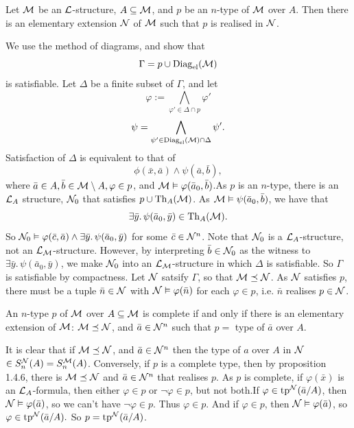 \documentclass{article}
\numberwithin{thm}{subsection}
\begin{document}
\begin{fancyprop}{}
    Let $\mathcal{M}$ be an $\mathcal{L}$-structure, $A \subseteq \mathcal{M}$, and $p$ be an $n$-type of $\mathcal{M}$ over $A$. Then there is an elementary extension $\mathcal{N}$ of $\mathcal{M}$ such that $p$ is realised in $\mathcal{N}$.
\end{fancyprop}
\proof We use the method of diagrams, and show that \[ \Gamma = p \cup \operatorname{Diag}_{\text{el}}(\mathcal{M})\] is satisfiable. \gap
Let $\Delta$ be a finite subset of $\Gamma$, and let \[ \varphi := \bigwedge_{\varphi' \in \Delta \cap p} \varphi'\] \[ \psi = \bigwedge_{\psi' \in \operatorname{Diag}_{\text{el}}(\mathcal{M}) \cap \Delta } \psi'. \]
Satisfaction of $\Delta$ is equivalent to that of \[ \phi(\bar x, \bar a) \wedge \psi(\bar a, \bar b),\]
where $\bar a \in A, \bar b \in \mathcal{M} \setminus A, \varphi \in p$, and $\mathcal{M} \vDash \varphi(\bar a_{0}, \bar b)$.\gap As $p$ is an $n$-type, there is an $\mathcal{L}_{A}$ structure, $\mathcal{N}_{0}$ that satisfies $p \cup \operatorname{Th}_{A}(\mathcal{M})$. As $\mathcal{M} \vDash \psi(\bar a_{0}, \bar b)$, we have that \[ \exists \bar y. \, \psi(\bar a_{0}, \bar y) \in \operatorname{Th}_{A}(\mathcal{M}).\] So $\mathcal{N}_{0} \vDash \varphi(\bar c, \bar a) \wedge \exists \bar y. \, \psi( \bar a_{0}, \bar y)$ for some $\bar c \in \mathcal{N}^{n}$. Note that $\mathcal{N}_{0}$ is a $\mathcal{L}_{A}$-structure, not an $\mathcal{L}_{\mathcal{M}}$-structure. However, by interpreting $\bar b \in \mathcal{N}_{0}$ as the witness to $\exists \bar y. \, \psi(\bar a_{0}, \bar y)$, we make $\mathcal{N}_{0}$ into an $\mathcal{L}_{\mathcal{M}}$-structure in which $\Delta$ is satisfiable. So $\Gamma$ is satisfiable by compactness. \gap Let $\mathcal{N}$ satsify $\Gamma$, so that $\mathcal{M} \preceq \mathcal{N}$. As $\mathcal{N}$ satisfies $p$, there must be a tuple $\bar n \in \mathcal{N}$ with $\mathcal{N} \vDash \varphi(\bar n)$ for each $\varphi \in p$, i.e. $\bar n$ realises $p \in \mathcal{N}$. \endproof
\begin{corr}{}
    An $n$-type $p$ of $\mathcal{M}$ over $A \subseteq \mathcal{M}$ is complete if and only if there is an elementary extension of $\mathcal{M}$: $\mathcal{M} \preceq \mathcal{N}$, and $\bar a \in \mathcal{N}^{n}$ such that $p = $ type of $\bar a$ over $A$.
\end{corr}
\proof It is clear that if $\mathcal{M} \preceq \mathcal{N}$, and $\bar a \in \mathcal{N}^{n}$ then the type of $a$ over $A$ in $\mathcal{N}$ $\in S_{n}^{\mathcal{N}}(A)=S_{n}^{\mathcal{M}}(A)$. \gap Conversely, if $p$ is a complete type, then by proposition 1.4.6, there is $\mathcal{M} \preceq \mathcal{N}$ and $\bar a \in \mathcal{N}^{n}$ that realises $p$. As $p$ is complete, if $\varphi(\bar x)$ is an $\mathcal{L}_{A}$-formula, then either $\varphi \in p$ or $\neg \varphi \in p$, but not both.\gap If $\varphi \in \operatorname{tp}^{\mathcal{N}}(\bar a /A)$, then $\mathcal{N} \vDash \varphi(\bar a)$, so we can't have $\neg \varphi \in p$. Thus $\varphi \in p$. And if $\varphi \in p$, then $\mathcal{N} \vDash \varphi (\bar a)$, so $\varphi \in \operatorname{tp}^{\mathcal{N}}(\bar a /A).$ So $p= \operatorname{tp}^{\mathcal{N}}(\bar a /A)$.
\end{document}
